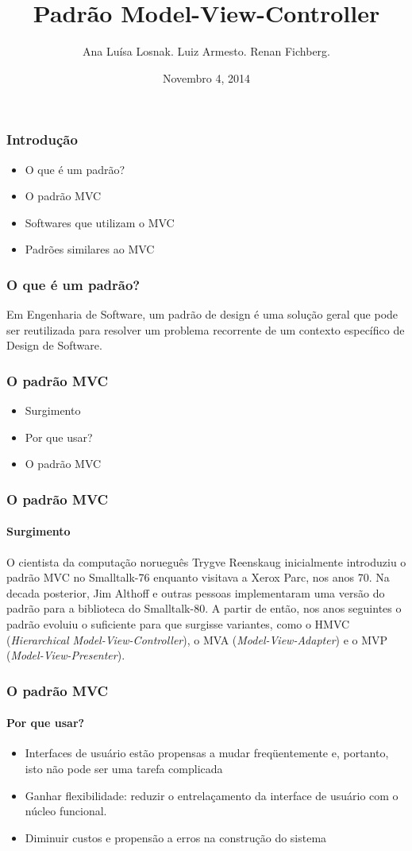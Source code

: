 \documentclass{beamer}
\title[Padrão Model-View-Controller]{Padrão Model-View-Controller}
\author{Ana Luísa Losnak. Luiz Armesto. Renan Fichberg.}
\date{Novembro 4, 2014}
\institute{Instituto de Matemática e Estatística da Universidade de São Paulo (IME-USP)}
\begin{document}
\begin{frame}
\titlepage
\end{frame}

\begin{frame}
\frametitle{Introdução}
\begin{itemize}
	\item O que é um padrão?
	\item O padrão MVC
	\item Softwares que utilizam o MVC
	\item Padrões similares ao MVC
\end{itemize}
\end{frame}

\begin{frame}
\frametitle{O que é um padrão?}
	Em Engenharia de Software, um padrão de design é uma solução geral que pode ser reutilizada para resolver um problema recorrente de um contexto específico de Design de Software.
\end{frame}

\begin{frame}
\frametitle{O padrão MVC}
\begin{itemize}
	\item Surgimento
	\item Por que usar?
	\item O padrão MVC
\end{itemize}
\end{frame}

\begin{frame}
\frametitle{O padrão MVC}
\framesubtitle{Surgimento}
	O cientista da computação norueguês Trygve Reenskaug inicialmente introduziu o padrão MVC no Smalltalk-76 enquanto visitava a Xerox Parc, nos anos 70. Na decada posterior, Jim Althoff e outras pessoas implementaram uma versão do padrão para a biblioteca do Smalltalk-80. A partir de então, nos anos seguintes o padrão evoluiu o suficiente para que surgisse variantes, como o HMVC (\textit{Hierarchical Model-View-Controller}), o MVA (\textit{Model-View-Adapter}) e o MVP (\textit{Model-View-Presenter}).
\end{frame}

\begin{frame}
\frametitle{O padrão MVC}
\framesubtitle{Por que usar?}
\begin{itemize}
	\item Interfaces de usuário estão propensas a mudar freqüentemente e, portanto, isto não pode ser uma tarefa complicada
	\item Ganhar flexibilidade: reduzir o entrelaçamento da interface de usuário com o núcleo funcional.
	\item Diminuir custos e propensão a erros na construção do sistema
\end{itemize}
\end{frame}
\end{document}
